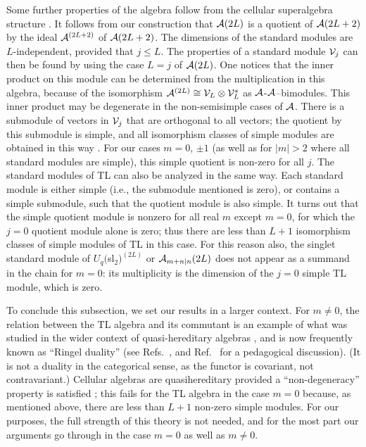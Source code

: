 \documentclass[twocolumn,floats,pra]{revtex4}
\def \cA {{\cal A}}
\begin{document}
Some further properties of the algebra follow from the cellular
superalgebra structure \cite{gl,mathas}. It follows from our
construction that $\cA(2L)$ is a quotient of $\cA(2L+2)$ by the
ideal $\cA^{(2L+2)}$ of $\cA(2L+2)$. The dimensions of the
standard modules are $L$-independent, provided that $j\leq L$. The
properties of a standard module ${\cal V}_j$ can then be found by
using the case $L=j$ of $\cA(2L)$. One notices that the inner
product on this module can be determined from the multiplication
in this algebra, because of the isomorphism $\cA^{(2L)}\cong {\cal
V}_{L}\otimes {\cal V}_{L}^s$ as $\cA$-$\cA$--bimodules. This
inner product may be degenerate in the non-semisimple cases of
$\cA$. There is a submodule of vectors in ${\cal V}_j$ that are
orthogonal to all vectors; the quotient by this submodule is
simple, and all isomorphism classes of simple modules are obtained
in this way \cite{gl,mathas}. For our cases $m=0$, $\pm 1$ (as
well as for $|m|>2$ where all standard modules are simple), this
simple quotient is non-zero for all $j$. The standard modules of
TL can also be analyzed in the same way. Each standard module is
either simple (i.e., the submodule mentioned is zero), or contains
a simple submodule, such that the quotient module is also simple.
It turns out that the simple quotient module is nonzero for all
real $m$ except $m=0$, for which the $j=0$ quotient module alone
is zero; thus there are less than $L+1$ isomorphism classes of
simple modules of TL in this case. For this reason also, the
singlet standard module of $U_q($sl$_2)^{(2L)}$ or
$\cA_{m+n|n}(2L)$ does not appear as a summand in the chain for
$m=0$: its multiplicity is the dimension of the $j=0$ simple TL
module, which is zero.

To conclude this subsection, we set our results in a larger
context. For $m\neq0$, the relation between the TL algebra and its
commutant is an example of what was studied in the wider context
of quasi-hereditary algebras \cite{ringel}, and is now frequently
known as ``Ringel duality'' (see Refs.\
\cite{mathas,smartin,dps,martin4}, and Ref.\ \cite{martin4} for a
pedagogical discussion). (It is not a duality in the categorical
sense, as the functor is covariant, not contravariant.) Cellular
algebras are quasihereditary provided a ``non-degeneracy''
property is satisfied \cite{mathas}; this fails for the TL algebra
in the case $m=0$ because, as mentioned above, there are less than
$L+1$ non-zero simple modules. For our purposes, the full strength
of this theory is not needed, and for the most part our arguments
go through in the case $m=0$ as well as $m\neq0$.
\end{document}
